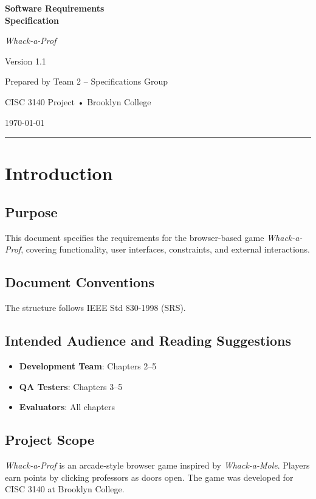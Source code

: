 \documentclass[11pt]{scrreprt}
\date{\today}
\newcommand*{\product}{\textit{Whack-a-Prof}\xspace}
\def\version{1.1}
\begin{document}
\begin{titlepage}
  \centering
  {\Huge\bfseries Software Requirements\\[4pt] Specification\par}
  \vspace{1.5cm}
  {\LARGE \product\par}
  \vfill
  {\Large Version \version\par}
  \vspace{1cm}
  {\large Prepared by Team 2 – Specifications Group\par}
  {\large CISC 3140 Project • Brooklyn College\par}
  {\large \today}
  \vfill
  \rule{\linewidth}{0.5mm}
\end{titlepage}

\tableofcontents
\clearpage

\chapter{Introduction}

\section{Purpose}
This document specifies the requirements for the browser-based game \product, covering functionality, user interfaces, constraints, and external interactions.

\section{Document Conventions}
The structure follows IEEE Std 830-1998 (SRS).

\section{Intended Audience and Reading Suggestions}
\begin{itemize}
  \item \textbf{Development Team}: Chapters 2–5
  \item \textbf{QA Testers}: Chapters 3–5
  \item \textbf{Evaluators}: All chapters
\end{itemize}

\section{Project Scope}
\product is an arcade-style browser game inspired by \emph{Whack-a-Mole}. Players earn points by clicking professors as doors open. The game was developed for CISC 3140 at Brooklyn College.
\end{document}
